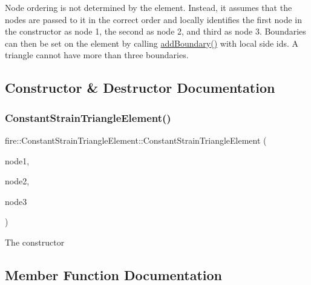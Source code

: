 Node ordering is not determined by the element. Instead, it assumes that the nodes are passed to it in the correct order and locally identifies the first node in the constructor as node 1, the second as node 2, and third as node 3. Boundaries can then be set on the element by calling \hyperlink{a00764_a87952ca08b448d38c7e932f27da499d3}{add\+Boundary()} with local side ids. A triangle cannot have more than three boundaries. 

\subsection{Constructor \& Destructor Documentation}
\mbox{\label{a00764_aa54c09f1dd7cacaf1f4f0b1428859c00}} 
\subsubsection{\texorpdfstring{Constant\+Strain\+Triangle\+Element()}{ConstantStrainTriangleElement()}}
{\footnotesize\ttfamily fire\+::\+Constant\+Strain\+Triangle\+Element\+::\+Constant\+Strain\+Triangle\+Element (\begin{DoxyParamCaption}\item[{const \hyperlink{a00189_a92dafcc05a788e1065a5792b67f0f70e}{Two\+D\+Node} \&}]{node1,  }\item[{const \hyperlink{a00189_a92dafcc05a788e1065a5792b67f0f70e}{Two\+D\+Node} \&}]{node2,  }\item[{const \hyperlink{a00189_a92dafcc05a788e1065a5792b67f0f70e}{Two\+D\+Node} \&}]{node3 }\end{DoxyParamCaption})}

The constructor 

\subsection{Member Function Documentation}
\mbox{\label{a00764_a87952ca08b448d38c7e932f27da499d3}} 
